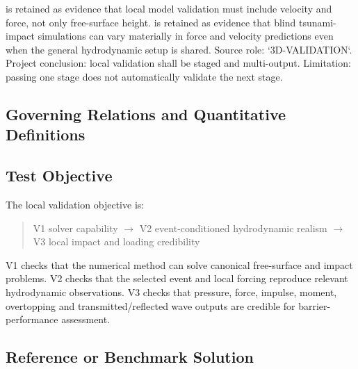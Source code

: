 \textcite{qin2018comparison} is retained as evidence that local model
validation must include velocity and force, not only free-surface
height. \textcite{watanabe2022validation} is retained as evidence that
blind tsunami-impact simulations can vary materially in force and
velocity predictions even when the general hydrodynamic setup is
shared. Source role: `3D-VALIDATION`. Project conclusion: local
validation shall be staged and multi-output. Limitation: passing one
stage does not automatically validate the next stage.

\subsection{Governing Relations and Quantitative Definitions}
\label{sec:res-ver-frm-governing-relations}

%

\subsection{Test Objective}
\label{sec:res-ver-frm-test-objective}


The local validation objective is:

\begin{quote}
  V1 solver capability
  $\rightarrow$
  V2 event-conditioned hydrodynamic realism
  $\rightarrow$
  V3 local impact and loading credibility
\end{quote}

V1 checks that the numerical method can solve canonical free-surface
and impact problems. V2 checks that the selected event and local
forcing reproduce relevant hydrodynamic observations. V3 checks that
pressure, force, impulse, moment, overtopping and transmitted/reflected
wave outputs are credible for barrier-performance assessment.

\subsection{Reference or Benchmark Solution}
\label{sec:res-ver-frm-reference-benchmark-solution}

